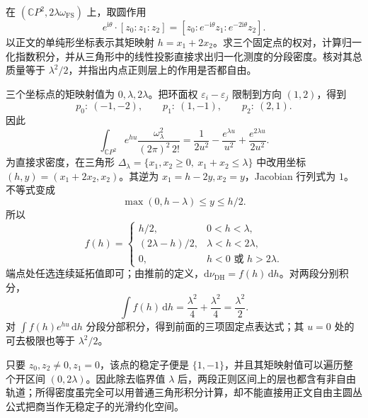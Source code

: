 \begin{optionalexercise}\label{g4:ex:1206:projective-circle-density}
	在 \((\mathbb CP^2,2\lambda\omega_{\mathrm{FS}})\) 上，取圆作用
	\[
		e^{\mathrm{i}\theta}\cdot[z_0:z_1:z_2]
		=[z_0:e^{-\mathrm{i}\theta}z_1:e^{-2\mathrm{i}\theta}z_2].
	\]
	以正文的单纯形坐标表示其矩映射 \(h=x_1+2x_2\)。求三个固定点的权对，计算归一化指数积分，并从三角形中的线性投影直接求出归一化测度的分段密度。核对其总质量等于 \(\lambda^2/2\)，并指出内点正则层上的作用是否都自由。
\end{optionalexercise}
\begin{solution}
	三个坐标点的矩映射值为 \(0,\lambda,2\lambda\)。把环面权 \(\varepsilon_i-\varepsilon_j\) 限制到方向 \((1,2)\)，得到
	\[
		p_0:\ (-1,-2),\qquad
		p_1:\ (1,-1),\qquad
		p_2:\ (2,1).
	\]
	因此
	\[
		\int_{\mathbb CP^2}e^{hu}\frac{\omega_\lambda^2}{(2\pi)^2\,2!}
		=\frac1{2u^2}-\frac{e^{\lambda u}}{u^2}
		+\frac{e^{2\lambda u}}{2u^2}.
	\]
	为直接求密度，在三角形
	\(\Delta_\lambda=\{x_1,x_2\ge0,\ x_1+x_2\le\lambda\}\)
	中改用坐标 \((h,y)=(x_1+2x_2,x_2)\)。其逆为 \(x_1=h-2y,x_2=y\)，Jacobian 行列式为 \(1\)。不等式变成
	\[
		\max(0,h-\lambda)\le y\le h/2.
	\]
	所以
	\[
		f(h)=
		\begin{cases}
			h/2,&0<h<\lambda,\\
			(2\lambda-h)/2,&\lambda<h<2\lambda,\\
			0,&h<0\text{ 或 }h>2\lambda.
		\end{cases}
	\]
	端点处任选连续延拓值即可；由推前的定义，\(\mathrm{d}\nu_{\mathrm{DH}}=f(h)\,\mathrm{d}h\)。对两段分别积分，
	\[
		\int f(h)\,\mathrm{d}h
		=\frac{\lambda^2}{4}+\frac{\lambda^2}{4}
		=\frac{\lambda^2}{2}.
	\]
	对 \(\int f(h)e^{hu}\,\mathrm{d}h\) 分段分部积分，得到前面的三项固定点表达式；其 \(u=0\) 处的可去极限也等于 \(\lambda^2/2\)。

	只要 \(z_0,z_2\ne0,z_1=0\)，该点的稳定子便是 \(\{1,-1\}\)，并且其矩映射值可以遍历整个开区间 \((0,2\lambda)\)。因此除去临界值 \(\lambda\) 后，两段正则区间上的层也都含有非自由轨道；所得密度虽完全可以用普通三角形积分计算，却不能直接用正文自由主圆丛公式把商当作无稳定子的光滑约化空间。
\end{solution}

